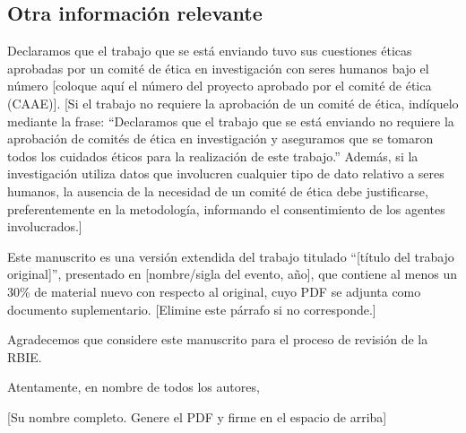\documentclass[11pt,a4paper,spanish]{article}
\begin{document}
\subsection*{Otra información relevante}
Declaramos que el trabajo que se está enviando tuvo sus cuestiones éticas aprobadas por un comité de ética en investigación con seres humanos bajo el número [coloque aquí el número del proyecto aprobado por el comité de ética (CAAE)]. [Si el trabajo no requiere la aprobación de un comité de ética, indíquelo mediante la frase: ``Declaramos que el trabajo que se está enviando no requiere la aprobación de comités de ética en investigación y aseguramos que se tomaron todos los cuidados éticos para la realización de este trabajo.'' Además, si la investigación utiliza datos que involucren cualquier tipo de dato relativo a seres humanos, la ausencia de la necesidad de un comité de ética debe justificarse, preferentemente en la metodología, informando el consentimiento de los agentes involucrados.]

Este manuscrito es una versión extendida del trabajo titulado ``[título del trabajo original]'', presentado en [nombre/sigla del evento, año], que contiene al menos un 30\% de material nuevo con respecto al original, cuyo PDF se adjunta como documento suplementario. [Elimine este párrafo si no corresponde.]

\bigskip

Agradecemos que considere este manuscrito para el proceso de revisión de la RBIE.

Atentamente, en nombre de todos los autores,

\vspace{2.5cm}

[Su nombre completo. Genere el PDF y firme en el espacio de arriba]
\end{document}
